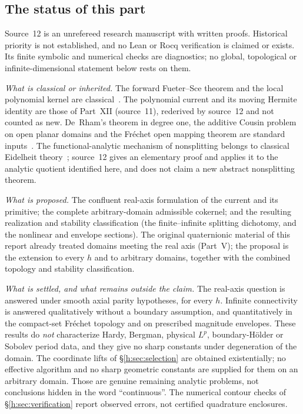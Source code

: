 \documentclass[11pt,a4paper]{article}
\numberwithin{equation}{section}
\theoremstyle{definition}
\theoremstyle{remark}
\theoremstyle{plain}
\begin{document}
\subsection{The status of this part}
\label{h:sub:status}

Source~12 is an unrefereed research manuscript with written proofs. Historical
priority is not established, and no Lean or Rocq verification is claimed or
exists. Its finite symbolic and numerical checks are diagnostics; no global,
topological or infinite-dimensional statement below rests on them.

\emph{What is classical or inherited.} The forward Fueter--Sce theorem and the
local polynomial kernel are classical~\cite{CSS,CPSS}. The polynomial current
and its moving Hermite identity are those of Part~XII (source~11), rederived by
source~12 and not counted as new. De~Rham's theorem in degree one, the additive
Cousin problem on open planar domains and the Fr\'echet open mapping theorem
are standard inputs~\cite{Forster}. The functional-analytic mechanism of
nonsplitting belongs to classical Eidelheit theory~\cite{Vogt,DV}; source~12
gives an elementary proof and applies it to the analytic quotient identified
here, and does not claim a new abstract nonsplitting theorem.

\emph{What is proposed.} The confluent real-axis formulation of the current
and its primitive; the complete arbitrary-domain admissible cokernel; and the
resulting realization and stability classification (the finite--infinite
splitting dichotomy, and the nonlinear and envelope sections). The original
quaternionic material of this report already treated domains meeting the real
axis (Part~V); the proposal is the extension to every $h$ and to arbitrary
domains, together with the combined topology and stability classification.

\emph{What is settled, and what remains outside the claim.} The real-axis
question is answered under smooth axial parity hypotheses, for every $h$.
Infinite connectivity is answered qualitatively without a boundary assumption,
and quantitatively in the compact-set Fr\'echet topology and on prescribed
magnitude envelopes. These results do \emph{not} characterize Hardy, Bergman,
physical $L^p$, boundary-H\"older or Sobolev period data, and they give no
sharp constants under degeneration of the domain. The coordinate lifts of
\S\ref{h:sec:selection} are obtained existentially; no effective algorithm and
no sharp geometric constants are supplied for them on an arbitrary domain.
Those are genuine remaining analytic problems, not conclusions hidden in the
word ``continuous''. The numerical contour checks of \S\ref{h:sec:verification}
report observed errors, not certified quadrature enclosures.
\end{document}
